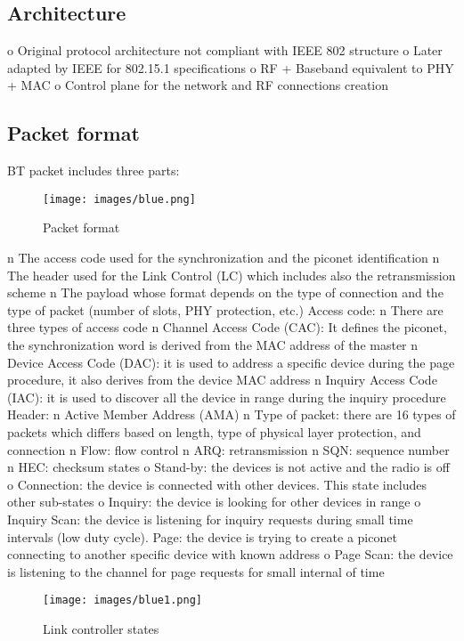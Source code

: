 \subsection{Architecture}
o Original protocol
architecture not
compliant with IEEE
802 structure
o Later adapted by
IEEE for 802.15.1
specifications
o RF + Baseband
equivalent to PHY +
MAC
o Control plane for the
network and
RF connections creation

\subsection{Packet format}
BT packet includes three parts:
\begin{figure}[H]
    \centering
    \texttt{[image: images/blue.png]}
    \caption{Packet format}
\end{figure}
n The access code used for the synchronization
and the piconet identification
n The header used for the Link Control (LC) which
includes also the retransmission scheme
n The payload whose format depends on the type
of connection and the type of packet (number of
slots, PHY protection, etc.)
Access code:
n There are three types of access code
n Channel Access Code (CAC): It defines the piconet,
the synchronization word is derived from the MAC
address of the master
n Device Access Code (DAC): it is used to address a
specific device during the page procedure, it also
derives from the device MAC address
n Inquiry Access Code (IAC): it is used to discover all
the device in range during the inquiry procedure
Header:
n Active Member Address (AMA)
n Type of packet: there are 16 types of packets
which differs based on length, type of physical
layer protection, and connection
n Flow: flow control
n ARQ: retransmission
n SQN: sequence number
n HEC: checksum
states
o Stand-by: the devices is not active and the
radio is off
o Connection: the device is connected with
other devices. This state includes other
sub-states
o Inquiry: the device is looking for other devices in range
o Inquiry Scan: the device is listening for inquiry requests during small time intervals
(low duty cycle).
Page: the device is trying to create a piconet
connecting to another specific device with
known address
o Page Scan: the device is listening to the
channel for page requests for small internal of
time
\begin{figure}[H]
    \centering
    \texttt{[image: images/blue1.png]}
    \caption{Link controller states}
\end{figure}

